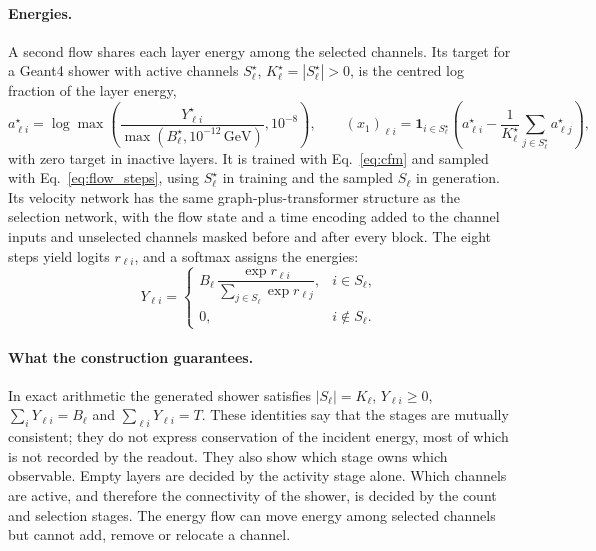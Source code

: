 \documentclass[11pt]{article}
\newcommand{\GeV}{\,\mathrm{GeV}}
\begin{document}
\paragraph{Energies.} A second flow shares each layer energy among the selected channels. Its target for a Geant4 shower with active channels $S_\ell^\star$, $K_\ell^\star=|S_\ell^\star|>0$, is the centred log fraction of the layer energy,
\begin{equation}
 a_{\ell i}^\star=\log\max\!\left(
 \frac{Y_{\ell i}^\star}{\max(B_\ell^\star,10^{-12}\GeV)},10^{-8}\right),\qquad
 (x_1)_{\ell i}=\mathbf 1_{i\in S_\ell^\star}
 \left(a_{\ell i}^\star-\frac{1}{K_\ell^\star}
 \sum_{j\in S_\ell^\star}a_{\ell j}^\star\right),
 \label{eq:share_target}
\end{equation}
with zero target in inactive layers. It is trained with Eq.~\eqref{eq:cfm} and sampled with Eq.~\eqref{eq:flow_steps}, using $S_\ell^\star$ in training and the sampled $S_\ell$ in generation. Its velocity network has the same graph-plus-transformer structure as the selection network, with the flow state and a time encoding added to the channel inputs and unselected channels masked before and after every block. The eight steps yield logits $r_{\ell i}$, and a softmax assigns the energies:
\begin{equation}
 Y_{\ell i}=
 \begin{cases}
 B_\ell\,\dfrac{\exp r_{\ell i}}{\sum_{j\in S_\ell}\exp r_{\ell j}}, & i\in S_\ell,\\[6pt]
 0, & i\notin S_\ell.
 \end{cases}
 \label{eq:decoder}
\end{equation}

\paragraph{What the construction guarantees.} In exact arithmetic the generated shower satisfies $|S_\ell|=K_\ell$, $Y_{\ell i}\geq0$, $\sum_iY_{\ell i}=B_\ell$ and $\sum_{\ell i}Y_{\ell i}=T$. These identities say that the stages are mutually consistent; they do not express conservation of the incident energy, most of which is not recorded by the readout. They also show which stage owns which observable. Empty layers are decided by the activity stage alone. Which channels are active, and therefore the connectivity of the shower, is decided by the count and selection stages. The energy flow can move energy among selected channels but cannot add, remove or relocate a channel.
\end{document}
